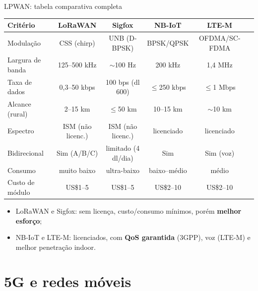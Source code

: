 \documentclass[aspectratio=169,11pt]{beamer}
\begin{document}
\begin{frame}{LPWAN: tabela comparativa completa}
  \begin{center}
    \tiny
    \begin{tabular}{@{}lccccc@{}}
      \toprule
      \textbf{Critério} & \textbf{LoRaWAN} & \textbf{Sigfox} & \textbf{NB-IoT} & \textbf{LTE-M}\\
      \midrule
      Modulação & CSS (chirp) & UNB (D-BPSK) & BPSK/QPSK & OFDMA/SC-FDMA\\
      Largura de banda & 125--500 kHz & $\sim$100 Hz & 200 kHz & 1,4 MHz\\
      Taxa de dados & 0,3--50 kbps & 100 bps (dl 600) & $\le$250 kbps & $\le$1 Mbps\\
      Alcance (rural) & 2--15 km & $\le$50 km & 10--15 km & $\sim$10 km\\
      Espectro & ISM (não licenc.) & ISM (não licenc.) & licenciado & licenciado\\
      Bidirecional & Sim (A/B/C) & limitado (4 dl/dia) & Sim & Sim (voz)\\
      Consumo & muito baixo & ultra-baixo & baixo--médio & médio\\
      Custo de módulo & US\$1--5 & US\$1--5 & US\$2--10 & US\$2--10\\
      \bottomrule
    \end{tabular}
  \end{center}
  \vspace{0.15cm}
  \begin{itemize}
    \item LoRaWAN e Sigfox: sem licença, custo/consumo mínimos, porém \textbf{melhor esforço};
    \item NB-IoT e LTE-M: licenciados, com \textbf{QoS garantida} (3GPP), voz (LTE-M) e melhor penetração indoor.
  \end{itemize}
\end{frame}

\section{5G e redes móveis}
\end{document}
